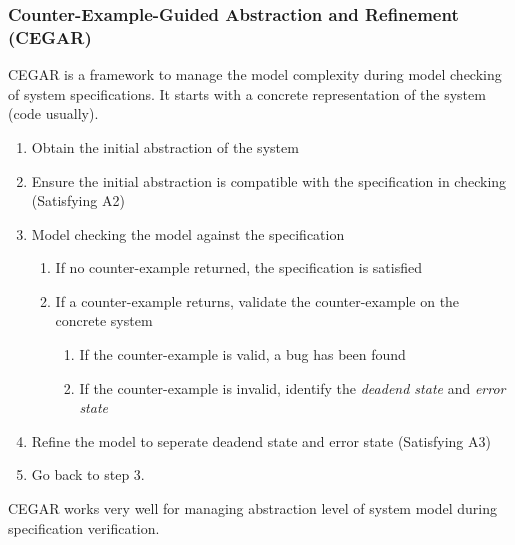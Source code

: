 \documentclass{llncs}
\begin{document}
\subsubsection{Counter-Example-Guided Abstraction and Refinement (CEGAR)}
CEGAR is a framework to manage the model complexity during model checking of system specifications. It starts with a concrete representation of the system (code usually).
\begin{enumerate}
	\item Obtain the initial abstraction of the system
    \item Ensure the initial abstraction is compatible with the specification in checking (Satisfying A2)
    \item Model checking the model against the specification
    \begin{enumerate}
        \item If no counter-example returned, the specification is satisfied
        \item If a counter-example returns, validate the counter-example on the concrete system
        \begin{enumerate}
            \item If the counter-example is valid, a bug has been found
            \item If the counter-example is invalid, identify the \emph{deadend state} and \emph{error state}
        \end{enumerate}
    \end{enumerate}
    \item Refine the model to seperate deadend state and error state (Satisfying A3)
    \item Go back to step 3.
\end{enumerate}
CEGAR works very well for managing abstraction level of system model during specification verification.
\end{document}
